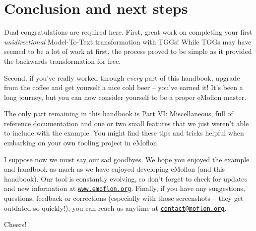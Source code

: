 \newpage
\section{Conclusion and next steps}
\genHeader

Dual congratulations are required here. First, great work on completing your first \emph{unidirectional} Model-To-Text transformation with TGGs! While TGGs
may have seemed to be a lot of work at first, the process proved to be simple as it provided the backwards transformation for free.

Second, if you've really worked through \emph{every} part of this handbook, upgrade from the coffee and get yourself a nice cold beer -- you've earned it! It's
been a long journey, but you can now consider yourself to be a proper eMoflon master.

The only part remaining in this handbook is Part VI: Miscellaneous, full of reference documentation and one or two small features that we just weren't able to
include with the example. You might find these tips and tricks helpful when embarking on your own tooling project in eMoflon.

I suppose now we must say our sad goodbyes. We hope you enjoyed the example and handbook as much as we have enjoyed developing eMoflon (and this handbook). Our
tool is constantly evolving, so don't forget to check for updates and new information at \texttt{\url{www.emoflon.org}}. Finally, if you have any suggestions,
questions, feedback or corrections (especially with those screenshots -- they get outdated so quickly!), you can reach us anytime at
\texttt{\href{mailto:contact@moflon.org}{contact@moflon.org}}.

Cheers!
